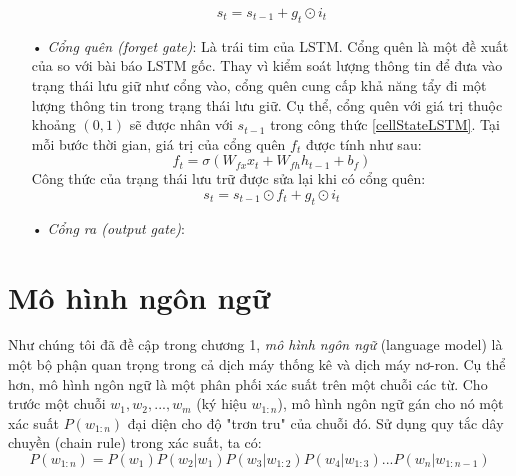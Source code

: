 \begin{itemize}
	\begin{equation} \label{cellStateLSTM}
		s_t = s_{t-1} + g_t \odot i_t
	\end{equation}
	\item[•] \textit{Cổng quên (forget gate)}: Là trái tim của LSTM. Cổng quên là một đề xuất của \cite{Gers2000} so với bài báo LSTM gốc. Thay vì kiểm soát lượng thông tin để đưa vào trạng thái lưu giữ như cổng vào, cổng quên cung cấp khả năng tẩy đi một lượng thông tin trong trạng thái lưu giữ. Cụ thể, cổng quên với giá trị thuộc khoảng $(0,1)$ sẽ được nhân với $s_{t-1}$ trong công thức \ref{cellStateLSTM}. Tại mỗi bước thời gian, giá trị của cổng quên $f_t$ được tính như sau:
	\begin{equation} \label{forgetGateLSTM}
		f_t = \sigma \left(W_{fx}x_t + W_{fh}h_{t-1} + b_f \right)
	\end{equation}
	Công thức của trạng thái lưu trữ được sửa lại khi có cổng quên:
	\begin{equation} \label{cellStateWithForgetGateLSTM}
		s_t = s_{t-1} \odot f_t + g_t \odot i_t
	\end{equation}
	\item[•] \textit{Cổng ra (output gate)}:
\end{itemize}



\section{Mô hình ngôn ngữ}

Như chúng tôi đã đề cập trong chương 1, \textit{mô hình ngôn ngữ} (language model) là một bộ phận quan trọng trong cả dịch máy thống kê và dịch máy nơ-ron. Cụ thể hơn, mô hình ngôn ngữ là một phân phối xác suất trên một chuỗi các từ. Cho trước một chuỗi $w_1,w_2,...,w_m$ (ký hiệu $w_{1:n}$), mô hình ngôn ngữ gán cho nó một xác suất $P(w_{1:n})$ đại diện cho độ "trơn tru" của chuỗi đó. Sử dụng quy tắc dây chuyền (chain rule) trong xác suất, ta có:
\begin{equation} \label{lmGeneral}
	P(w_{1:n}) = P(w_1)P(w_2|w_1)P(w_3|w_{1:2})P(w_4|w_{1:3})...P(w_n|w_{1:n-1})
\end{equation}














